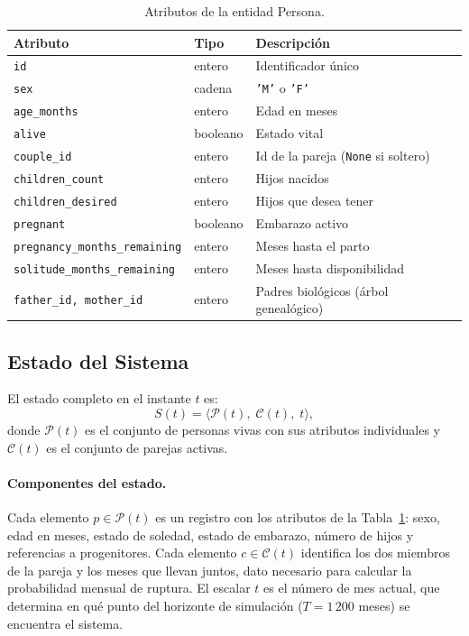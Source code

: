 \documentclass{llncs}
\begin{document}
\begin{table}[H]
\caption{Atributos de la entidad Persona.}
\label{tab:person}
\centering
\begin{tabular}{lll}
\toprule
\textbf{Atributo} & \textbf{Tipo} & \textbf{Descripción} \\
\midrule
\texttt{id}                          & entero   & Identificador único \\
\texttt{sex}                         & cadena   & \texttt{'M'} o \texttt{'F'} \\
\texttt{age\_months}                  & entero   & Edad en meses \\
\texttt{alive}                       & booleano & Estado vital \\
\texttt{couple\_id}                   & entero   & Id de la pareja (\texttt{None} si soltero) \\
\texttt{children\_count}              & entero   & Hijos nacidos \\
\texttt{children\_desired}            & entero   & Hijos que desea tener \\
\texttt{pregnant}                    & booleano & Embarazo activo \\
\texttt{pregnancy\_months\_remaining} & entero   & Meses hasta el parto \\
\texttt{solitude\_months\_remaining}  & entero   & Meses hasta disponibilidad \\
\texttt{father\_id, mother\_id}       & entero   & Padres biológicos (árbol genealógico) \\
\bottomrule
\end{tabular}
\end{table}

\subsection{Estado del Sistema}

El estado completo en el instante $t$ es:
\[
  S(t) = \bigl\langle \mathcal{P}(t),\; \mathcal{C}(t),\; t \bigr\rangle,
\]
donde $\mathcal{P}(t)$ es el conjunto de personas vivas con sus atributos
individuales y $\mathcal{C}(t)$ es el conjunto de parejas activas.

\paragraph{Componentes del estado.}
Cada elemento $p \in \mathcal{P}(t)$ es un registro con los atributos de la
Tabla~\ref{tab:person}: sexo, edad en meses, estado de soledad, estado de
embarazo, número de hijos y referencias a progenitores.
Cada elemento $c \in \mathcal{C}(t)$ identifica los dos miembros de la pareja
y los meses que llevan juntos, dato necesario para calcular la probabilidad
mensual de ruptura.
El escalar $t$ es el número de mes actual, que determina en qué punto del
horizonte de simulación ($T = 1\,200$ meses) se encuentra el sistema.
\end{document}
